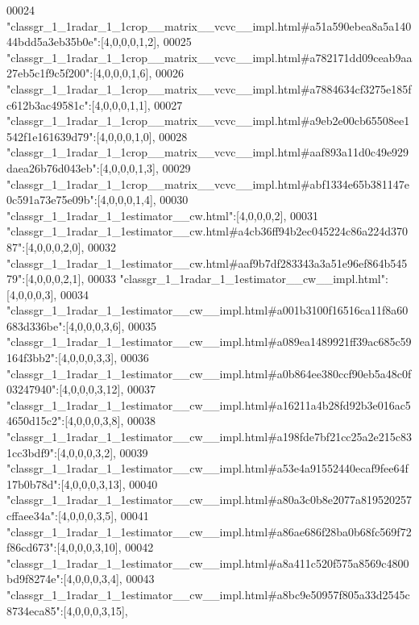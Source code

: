 \begin{DoxyCode}
00024 \textcolor{stringliteral}{"classgr\_1\_1radar\_1\_1crop\_\_matrix\_\_vcvc\_\_impl.html#a51a590ebea8a5a14044bdd5a3eb35b0e"}:[4,0,0,0,1,2],
00025 \textcolor{stringliteral}{"classgr\_1\_1radar\_1\_1crop\_\_matrix\_\_vcvc\_\_impl.html#a782171dd09ceab9aa27eb5c1f9c5f200"}:[4,0,0,0,1,6],
00026 \textcolor{stringliteral}{"classgr\_1\_1radar\_1\_1crop\_\_matrix\_\_vcvc\_\_impl.html#a7884634cf3275e185fc612b3ac49581c"}:[4,0,0,0,1,1],
00027 \textcolor{stringliteral}{"classgr\_1\_1radar\_1\_1crop\_\_matrix\_\_vcvc\_\_impl.html#a9eb2e00cb65508ee1542f1e161639d79"}:[4,0,0,0,1,0],
00028 \textcolor{stringliteral}{"classgr\_1\_1radar\_1\_1crop\_\_matrix\_\_vcvc\_\_impl.html#aaf893a11d0c49e929daea26b76d043eb"}:[4,0,0,0,1,3],
00029 \textcolor{stringliteral}{"classgr\_1\_1radar\_1\_1crop\_\_matrix\_\_vcvc\_\_impl.html#abf1334e65b381147e0c591a73e75e09b"}:[4,0,0,0,1,4],
00030 \textcolor{stringliteral}{"classgr\_1\_1radar\_1\_1estimator\_\_cw.html"}:[4,0,0,0,2],
00031 \textcolor{stringliteral}{"classgr\_1\_1radar\_1\_1estimator\_\_cw.html#a4cb36ff94b2ec045224c86a224d37087"}:[4,0,0,0,2,0],
00032 \textcolor{stringliteral}{"classgr\_1\_1radar\_1\_1estimator\_\_cw.html#aaf9b7df283343a3a51e96ef864b54579"}:[4,0,0,0,2,1],
00033 \textcolor{stringliteral}{"classgr\_1\_1radar\_1\_1estimator\_\_cw\_\_impl.html"}:[4,0,0,0,3],
00034 \textcolor{stringliteral}{"classgr\_1\_1radar\_1\_1estimator\_\_cw\_\_impl.html#a001b3100f16516ca11f8a60683d336be"}:[4,0,0,0,3,6],
00035 \textcolor{stringliteral}{"classgr\_1\_1radar\_1\_1estimator\_\_cw\_\_impl.html#a089ea1489921ff39ac685c59164f3bb2"}:[4,0,0,0,3,3],
00036 \textcolor{stringliteral}{"classgr\_1\_1radar\_1\_1estimator\_\_cw\_\_impl.html#a0b864ee380ccf90eb5a48c0f03247940"}:[4,0,0,0,3,12],
00037 \textcolor{stringliteral}{"classgr\_1\_1radar\_1\_1estimator\_\_cw\_\_impl.html#a16211a4b28fd92b3e016ac54650d15c2"}:[4,0,0,0,3,8],
00038 \textcolor{stringliteral}{"classgr\_1\_1radar\_1\_1estimator\_\_cw\_\_impl.html#a198fde7bf21cc25a2e215c831cc3bdf9"}:[4,0,0,0,3,2],
00039 \textcolor{stringliteral}{"classgr\_1\_1radar\_1\_1estimator\_\_cw\_\_impl.html#a53e4a91552440ecaf9fee64f17b0b78d"}:[4,0,0,0,3,13],
00040 \textcolor{stringliteral}{"classgr\_1\_1radar\_1\_1estimator\_\_cw\_\_impl.html#a80a3c0b8e2077a819520257cffaee34a"}:[4,0,0,0,3,5],
00041 \textcolor{stringliteral}{"classgr\_1\_1radar\_1\_1estimator\_\_cw\_\_impl.html#a86ae686f28ba0b68fc569f72f86cd673"}:[4,0,0,0,3,10],
00042 \textcolor{stringliteral}{"classgr\_1\_1radar\_1\_1estimator\_\_cw\_\_impl.html#a8a411c520f575a8569c4800bd9f8274e"}:[4,0,0,0,3,4],
00043 \textcolor{stringliteral}{"classgr\_1\_1radar\_1\_1estimator\_\_cw\_\_impl.html#a8bc9e50957f805a33d2545c8734eca85"}:[4,0,0,0,3,15],

\end{DoxyCode}
